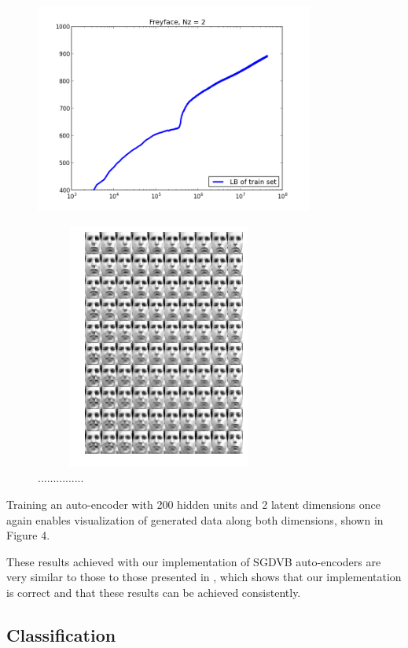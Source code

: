 \documentclass{article}
\begin{document}
\begin{figure}[htb]
\centering
\begin{minipage}{0.5\textwidth}
\includegraphics[height=3in,width=3.6in]{lowerboundFF.png}
\caption{...............}
\end{minipage}%
\centering
\begin{minipage}{0.5\textwidth}
\includegraphics[height=3.2in,width=3.2in]{manifoldFF.png}\caption{...............}
\end{minipage}
\end{figure}

Training an auto-encoder with 200 hidden units and 2 latent dimensions once again enables visualization of generated data along both dimensions, shown in Figure 4.

These results achieved with our implementation of SGDVB auto-encoders are very similar to those to those presented in \cite{kingma2013auto}, which shows that our implementation is correct and that these results can be achieved consistently. 

\subsection{Classification}
\end{document}
